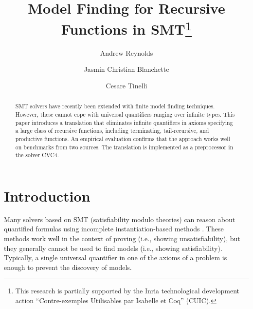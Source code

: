 \documentclass[runningheads,a4paper]{llncs}
\begin{document}
\title{Model Finding for Recursive Functions in SMT\thanks{%
This research is partially supported by the Inria technological development
action ``Contre-exemples Utilisables par Isabelle et Coq'' (CUIC).
}
}

\author {Andrew Reynolds \and Jasmin Christian Blanchette \and Cesare Tinelli }

\maketitle

\begin{abstract}
SMT solvers have recently been extended with finite model finding techniques.
However, these cannot cope with universal quantifiers ranging over infinite
types. This paper introduces a translation that eliminates infinite quantifiers
in axioms specifying a large class of recursive functions, including
terminating, tail-recursive, and productive functions. An empirical evaluation
confirms that the approach works well on benchmarks from two sources. The
translation is implemented as a preprocessor in the solver CVC4.
\end{abstract}

\section{Introduction}
\label{sec:introduction}

Many solvers based on SMT (satisfiability modulo theories) can reason about
quantified formulas using incomplete instantiation-based methods
\cite{MouraBjoerner07,ReynoldsTinelliMoura14}.
These methods work well in the context of proving (i.e., showing
unsatisfiability), but they generally cannot be used to find models (i.e.,
showing satisfiability). Typically, a single universal quantifier in one of the
axioms of a problem is enough to prevent the discovery of models.
\end{document}

